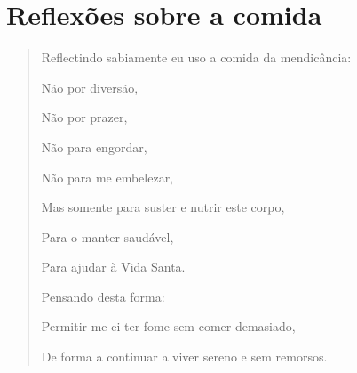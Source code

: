 \chapter{Reflexões sobre a comida}

\begin{quote}
Reflectindo sabiamente eu uso a comida da mendicância:

Não por diversão,

Não por prazer,

Não para engordar,

Não para me embelezar,

Mas somente para suster e nutrir este corpo,

Para o manter saudável,

Para ajudar à Vida Santa.

Pensando desta forma:

Permitir-me-ei ter fome sem comer demasiado,

De forma a continuar a viver sereno e sem remorsos.
\end{quote}
